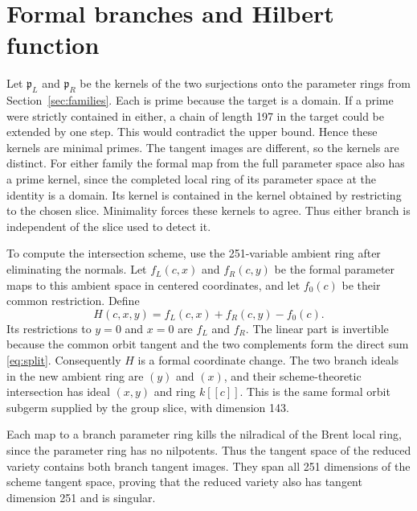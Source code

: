 \documentclass[11pt]{amsart}
\begin{document}
\section{Formal branches and Hilbert function}\label{sec:branches}

Let $\mathfrak p_L$ and $\mathfrak p_R$ be the kernels of the
two surjections onto the parameter rings from
Section~\ref{sec:families}. Each is prime because the target
is a domain. If a prime were strictly contained in either, a chain
of length 197 in the target could be extended by one step.
This would contradict the upper bound. Hence these kernels are
minimal primes. The tangent images are different, so the kernels
are distinct.
For either family the formal map from the full parameter space
also has a prime kernel, since the completed local ring of its
parameter space at the identity is a domain. Its kernel is
contained in the kernel obtained by restricting to the chosen
slice. Minimality forces these kernels to agree. Thus either
branch is independent of the slice used to detect it.

To compute the intersection scheme, use the 251-variable
ambient ring after eliminating the normals. Let $f_L(c,x)$ and
$f_R(c,y)$ be the formal parameter maps to this ambient space
in centered coordinates, and let $f_0(c)$ be their common
restriction. Define
\[
             H(c,x,y)=f_L(c,x)+f_R(c,y)-f_0(c).
\]
Its restrictions to $y=0$ and $x=0$ are $f_L$ and $f_R$.
The linear part is invertible because the common orbit tangent
and the two complements form the direct sum \eqref{eq:split}.
Consequently $H$ is a formal coordinate change. The two branch
ideals in the new ambient ring are $(y)$ and $(x)$, and their
scheme-theoretic intersection has ideal $(x,y)$ and ring $k[[c]]$.
This is the same formal orbit subgerm supplied by the group slice,
with dimension 143.

Each map to a branch parameter ring kills the nilradical of the
Brent local ring, since the parameter ring has no nilpotents.
Thus the tangent space of the reduced variety contains both
branch tangent images. They span all 251 dimensions of the
scheme tangent space, proving that the reduced variety also has
tangent dimension 251 and is singular.
\end{document}

